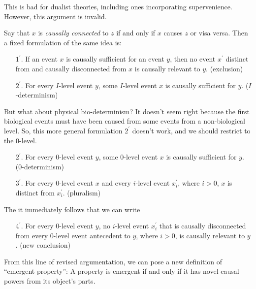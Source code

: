 \documentclass{article}
\newcommand{\ti}[1]{\textit{#1}}
\newcommand{\p}{^\prime}
\begin{document}
This is bad for dualist theories, including ones incorporating supervenience. However, this argument is invalid.

Say that $x$ is \ti{causally connected} to $z$ if and only if $x$ causes $z$ or visa versa. Then a fixed formulation of the same idea is:

\begin{enumerate}
    \item[$1\p$.] If an event $x$ is causally sufficient for an event $y$, then no event $x\p$ distinct from and causally disconnected from $x$ is causally relevant to $y$. (exclusion)
    \item[$2\p$.] For every $I$-level event $y$, some $I$-level event $x$ is causally sufficient for $y$. ($I$-determinism)
\end{enumerate}

But what about physical bio-determinism? It doesn't seem right because the first biological events must have been caused from some events from a non-biological level. So, this more general formulation $2\p$ doesn't work, and we should restrict to the 0-level.

\begin{enumerate}
    \item[$2\p$.] For every 0-level event $y$, some 0-level event $x$ is causally sufficient for $y$. (0-determinism)
    \item[$3\p$.] For every 0-level event $x$ and every $i$-level event $x\p_i$, where $i > 0$, $x$ is distinct from $x\p_i$. (pluralism)
\end{enumerate}

The it immediately follows that we can write

\begin{enumerate}
    \item[$4\p$.] For every 0-level event $y$, no $i$-level event $x\p_i$ that is causally disconnected from every 0-level event antecedent to $y$, where $i > 0$, is causally relevant to $y$. (new conclusion)
\end{enumerate}

From this line of revised argumentation, we can pose a new definition of ``emergent property'': A property is emergent if and only if it has novel causal powers from its object's parts.
\end{document}
